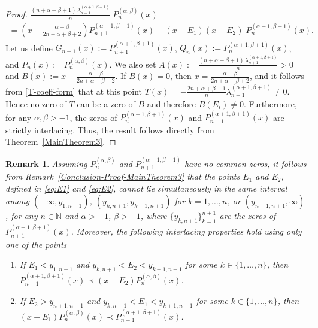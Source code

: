 \documentclass[final,3p,times,12pt]{elsarticle}
\newtheorem{remark}{Remark}[section]
\numberwithin{equation}{section}  %
\begin{document}
\begin{proof}
		$\displaystyle 	\frac{(n+\alpha+\beta+1)\,\lambda_{n+1}^{(\alpha+1,\beta+1)}}{n}\;
		{P}_{n}^{(\alpha,\beta)}(x)
		$
		\begin{align}
			\label{Mixed-TTRR-Monic-Jacobi2}
			=\left(x - \frac{\alpha-\beta}{2n+\alpha+\beta+2}\right)
			{P}_{n+1}^{(\alpha+1,\beta+1)}(x)
			- (x-E_1)(x-E_2)\;
			{P}_{n}^{(\alpha+1,\beta+1)}(x).
		\end{align}
		Let us define  
		$G_{n+1}(x) := {P}_{n+1}^{(\alpha+1,\beta+1)}(x)$,  
		$Q_{n}(x) := {P}_{n}^{(\alpha+1,\beta+1)}(x)$,  
		and $P_{n}(x) := {P}_{n}^{(\alpha,\beta)}(x)$.  
		We also set  
		$A(x) := \frac{(n+\alpha+\beta+1)\,\lambda_{n+1}^{(\alpha+1,\beta+1)}}{n} > 0$  
		and  
		$B(x) := x - \frac{\alpha - \beta}{2n + \alpha + \beta + 2}$. If $B(x)=0$, then $x=\frac{\alpha-\beta}{2n+\alpha+\beta+2}$, and it follows from \eqref{T-coeff-form} that at this point $T(x)=-\frac{2n+\alpha+\beta+1}{n}\lambda_{n+1}^{(\alpha+1,\beta+1)}\neq 0$. Hence no zero of $T$ can be a zero of $B$ and therefore $B(E_i)\neq 0$.
		Furthermore, for any $\alpha, \beta > -1$, the zeros of ${P}_{n}^{(\alpha+1,\beta+1)}(x)$ and ${P}_{n+1}^{(\alpha+1,\beta+1)}(x)$ are strictly interlacing.  Thus, the result follows directly from Theorem~\ref{MainTheorem3}.
	\end{proof}

    	\begin{remark} Assuming $P_n^{(\alpha,\beta)}$ and $P_{n+1}^{(\alpha+1,\beta+1)}$ have no common zeros, it follows from Remark~\ref{Conclusion-Proof-MainTheorem3} that the points $E_1$ and $E_2$, defined in \eqref{eq:E1} and \eqref{eq:E2}, cannot lie simultaneously in the same interval among $(-\infty, y_{1,n+1})$, $(y_{k,n+1}, y_{k+1,n+1})$ for $k=1,\dots,n$, or $(y_{n+1,n+1}, \infty)$, for any $n \in \mathbb{N}$ and $\alpha > -1$, $\beta > -1$, where $\{y_{k,n+1}\}_{k=1}^{n+1}$ are the zeros of $P^{(\alpha+1,\beta+1)}_{n+1}(x)$. Moreover, the following interlacing properties hold using only one of the points
		\begin{enumerate}[label=\alph*)]
			\item 
			If $E_1<y_{1,n+1}$ and $y_{k,n+1}<E_2<y_{k+1,n+1}$ for some $k\in\{1,\dots,n\}$, then $P^{(\alpha+1, \beta+1)}_{n+1}(x)\prec (x-E_2)P^{(\alpha, \beta)}_{n}(x)$.
			\item 
			If $E_2>y_{n+1,n+1}$ and $y_{k,n+1}<E_1<y_{k+1,n+1}$ for some $k\in\{1,\dots,n\}$, then $(x-E_1)P^{(\alpha, \beta)}_{n}(x)\prec P^{(\alpha+1, \beta+1)}_{n+1}(x)$.
		\end{enumerate}
	\end{remark}
	
\end{document}
